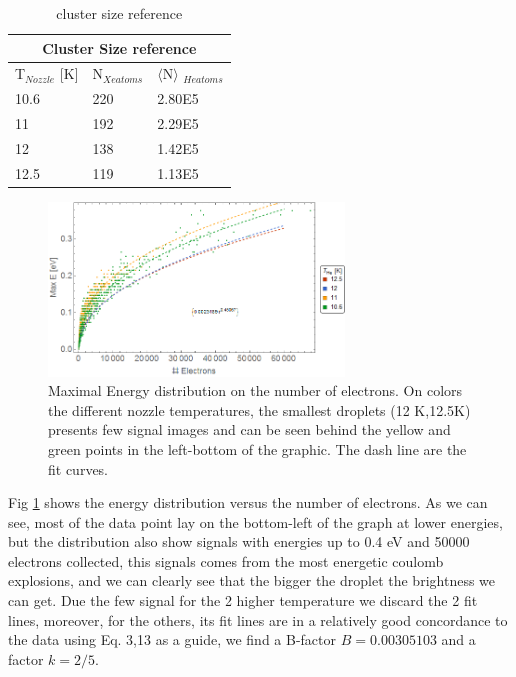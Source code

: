 \begin{table}[t]
\centering
\begin{tabular}{|l|l|l|}\hline
\multicolumn{3}{|c|}{Cluster Size reference}                                                             \\\hline
T$_{Nozzle}$ {[}K{]}  & N$_{Xe atoms}$ & $\langle$N$\rangle$ $_{He atoms}$ \\ \hline
10.6                  & 220     & 2.80E5                      \\ \hline
11                    & 192     & 2.29E5                      \\ \hline
12                    & 138     & 1.42E5                      \\ \hline
12.5                  & 119     & 1.13E5                     \\ \hline
\end{tabular}
\caption{cluster size reference}
\label{tab:clustersize}
\end{table}


\begin{figure}[h!]
\centering
\includegraphics[width=0.7\textwidth]{../Images/results/Mir_He_Dropletsize/fits.png} 
\caption[He-Xe droplet size distribution]{Maximal Energy distribution on the number of electrons. On colors the different nozzle temperatures, the smallest droplets (12 K,12.5K) presents few signal images and can be seen behind the yellow and green  points in the left-bottom of the graphic.  The dash line are the fit curves.}
\label{fig:energdistributionHeXeSize}
\end{figure}

Fig \ref{fig:energdistributionHeXeSize} shows the energy distribution versus the number of electrons. As we can see, most of the data point lay on the bottom-left of the graph at lower energies, but the distribution also show signals with energies up to 0.4 eV and 50000 electrons collected, this signals comes from the most energetic coulomb explosions, and we can clearly see that the bigger the droplet the  brightness we can get. Due the few signal for the 2 higher temperature we discard the 2 fit lines, moreover, for the others, its fit lines are in a relatively good concordance to the data using Eq. 3,13 as a guide, we find a B-factor $B=0.00305103$ and a factor $k=2/5$. 

